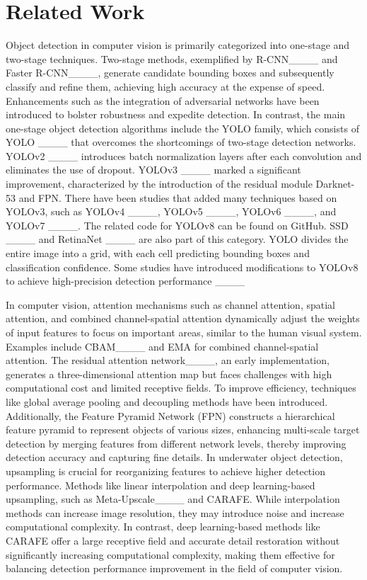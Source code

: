 \section{Related Work}
\label{sec2}


Object detection in computer vision is primarily categorized into one-stage and two-stage techniques. Two-stage methods, exemplified by R-CNN____ and Faster R-CNN____, generate candidate bounding boxes and subsequently classify and refine them, achieving high accuracy at the expense of speed. Enhancements such as the integration of adversarial networks have been introduced to bolster robustness and expedite detection. In contrast, the main one-stage object detection algorithms include the YOLO family, which consists of YOLO ____ that overcomes the shortcomings of two-stage detection networks. YOLOv2 ____ introduces batch normalization layers after each convolution and eliminates the use of dropout. YOLOv3 ____ marked a significant improvement, characterized by the introduction of the residual module Darknet-53 and FPN. There have been studies that added many techniques based on YOLOv3, such as YOLOv4 ____, YOLOv5 ____, YOLOv6 ____, and YOLOv7 ____. The related code for YOLOv8 can be found on GitHub. SSD ____ and RetinaNet ____ are also part of this category. YOLO divides the entire image into a grid, with each cell predicting bounding boxes and classification confidence. Some studies have introduced modifications to YOLOv8 to achieve high-precision detection performance ____

In computer vision, attention mechanisms such as channel attention, spatial attention, and combined channel-spatial attention dynamically adjust the weights of input features to focus on important areas, similar to the human visual system. Examples include CBAM____ and EMA for combined channel-spatial attention. The residual attention network____, an early implementation, generates a three-dimensional attention map but faces challenges with high computational cost and limited receptive fields. To improve efficiency, techniques like global average pooling and decoupling methods have been introduced. Additionally, the Feature Pyramid Network (FPN) constructs a hierarchical feature pyramid to represent objects of various sizes, enhancing multi-scale target detection by merging features from different network levels, thereby improving detection accuracy and capturing fine details. In underwater object detection, upsampling is crucial for reorganizing features to achieve higher detection performance. Methods like linear interpolation and deep learning-based upsampling, such as Meta-Upscale____ and CARAFE. While interpolation methods can increase image resolution, they may introduce noise and increase computational complexity. In contrast, deep learning-based methods like CARAFE offer a large receptive field and accurate detail restoration without significantly increasing computational complexity, making them effective for balancing detection performance improvement in the field of computer vision.